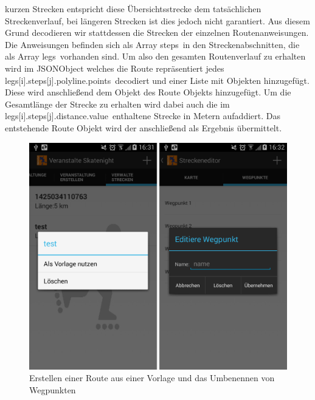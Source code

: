 kurzen Strecken entspricht diese Übersichtsstrecke dem tatsächlichen Streckenverlauf, bei längeren Strecken ist dies jedoch nicht garantiert. Aus diesem Grund decodieren wir stattdessen die Strecken der einzelnen Routenanweisungen. Die Anweisungen befinden sich als Array \glqq steps\grqq\ in den Streckenabschnitten, die als Array \glqq legs\grqq\ vorhanden sind. Um also den gesamten Routenverlauf zu erhalten wird im JSONObject welches die Route repräsentiert jedes \glqq legs[i].steps[j].polyline.points\grqq\ decodiert und einer Liste mit  Objekten hinzugefügt. Diese wird anschließend dem  Objekt des Route Objekts hinzugefügt. Um die Gesamtlänge der Strecke zu erhalten wird dabei auch die im \glqq legs[i].steps[j].distance.value\grqq\ enthaltene Strecke in Metern aufaddiert. Das entstehende Route Objekt wird der  anschließend als Ergebnis übermittelt.


\begin{figure}[htb]
\centering
\includegraphics[width=12cm]{graphics/Route_als_Vorlage_nutzen_Wegpunkte_benennen.png}
\caption{Erstellen einer Route aus einer Vorlage und das Umbenennen von Wegpunkten}
\label{fig:route_aus_vorlage}
\end{figure}

